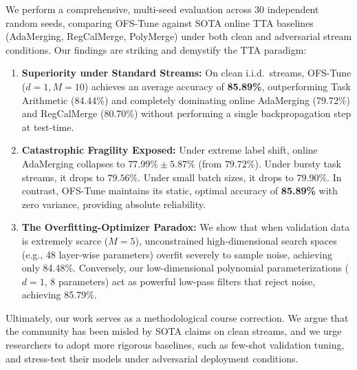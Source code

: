 We perform a comprehensive, multi-seed evaluation across 30 independent random seeds, comparing OFS-Tune against SOTA online TTA baselines (AdaMerging, RegCalMerge, PolyMerge) under both clean and adversarial stream conditions. Our findings are striking and demystify the TTA paradigm:
\begin{enumerate}
    \item \textbf{Superiority under Standard Streams:} On clean i.i.d.\ streams, OFS-Tune ($d=1, M=10$) achieves an average accuracy of \textbf{85.89\%}, outperforming Task Arithmetic (84.44\%) and completely dominating online AdaMerging (79.72\%) and RegCalMerge (80.70\%) without performing a single backpropagation step at test-time.
    \item \textbf{Catastrophic Fragility Exposed:} Under extreme label shift, online AdaMerging collapses to $77.99\% \pm 5.87\%$ (from $79.72\%$). Under bursty task streams, it drops to $79.56\%$. Under small batch sizes, it drops to $79.90\%$. In contrast, OFS-Tune maintains its static, optimal accuracy of \textbf{85.89\%} with zero variance, providing absolute reliability.
    \item \textbf{The Overfitting-Optimizer Paradox:} We show that when validation data is extremely scarce ($M=5$), unconstrained high-dimensional search spaces (e.g., 48 layer-wise parameters) overfit severely to sample noise, achieving only 84.48\%. Conversely, our low-dimensional polynomial parameterizations ($d=1$, 8 parameters) act as powerful low-pass filters that reject noise, achieving 85.79\%.
\end{enumerate}

Ultimately, our work serves as a methodological course correction. We argue that the community has been misled by SOTA claims on clean streams, and we urge researchers to adopt more rigorous baselines, such as few-shot validation tuning, and stress-test their models under adversarial deployment conditions.
